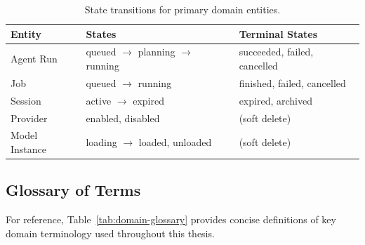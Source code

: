 \begin{table}[htbp]
    \centering
    \caption{State transitions for primary domain entities.}
    \label{tab:entity-lifecycle}
    \small
    \begin{tabular}{lll}
        \toprule
        \textbf{Entity} & \textbf{States} & \textbf{Terminal States} \\
        \midrule
        Agent Run & queued $\to$ planning $\to$ running & succeeded, failed, cancelled \\
        Job & queued $\to$ running & finished, failed, cancelled \\
        Session & active $\to$ expired & expired, archived \\
        Provider & enabled, disabled & (soft delete) \\
        Model Instance & loading $\to$ loaded, unloaded & (soft delete) \\
        \bottomrule
    \end{tabular}
\end{table}

\subsection{Glossary of Terms}

For reference, Table~\ref{tab:domain-glossary} provides concise definitions of key domain terminology used throughout this thesis.

